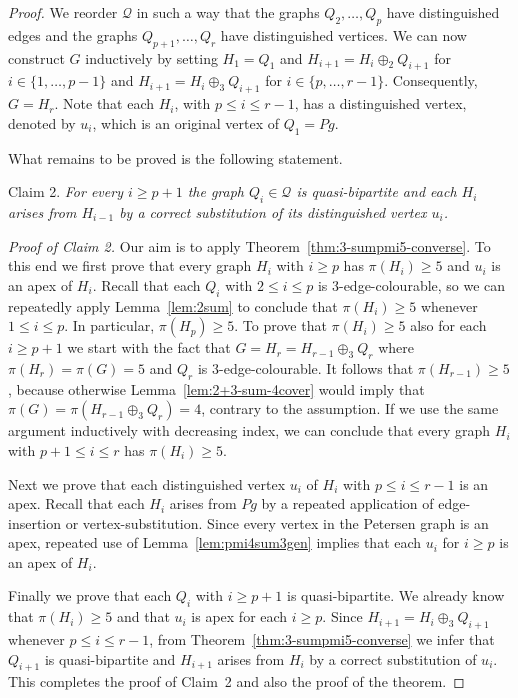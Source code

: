 \documentclass[a4paper]{amsart}
\theoremstyle{plain}
\theoremstyle{definition}
\begin{document}
\begin{proof}
We reorder $\mathcal{Q}$ in such a way that the graphs $Q_2,
\ldots, Q_p$ have distinguished edges and the graphs $Q_{p+1},
\ldots, Q_r$ have distinguished vertices. We can now construct
$G$ inductively by setting $H_1=Q_1$ and $H_{i+1}=H_i\oplus_2
Q_{i+1}$ for $i\in\{1,\ldots, p-1\}$ and $H_{i+1}=H_i\oplus_3
Q_{i+1}$ for $i\in\{p, \ldots, r-1\}$. Consequently, $G=H_r$.
Note that each $H_i$, with $p\le i\le r-1$, has a distinguished
vertex, denoted by $u_i$, which is an original vertex of
$Q_1=Pg$.

What remains to be proved is the following statement.

\medskip\noindent
Claim 2. \emph{For every $i\ge p+1$ the graph
$Q_i\in\mathcal{Q}$ is quasi-bipartite and each $H_i$ arises
from $H_{i-1}$ by a correct substitution of its distinguished
vertex $u_i$.}

\medskip\noindent
\emph{Proof of Claim 2.} Our aim is to apply
Theorem~\ref{thm:3-sumpmi5-converse}. To this end we first
prove that every graph $H_i$ with $i\ge p$ has $\pi(H_i)\ge 5$
and $u_i$ is an apex of $H_i$. Recall that each $Q_i$ with
$2\le i\le p$ is $3$-edge-colourable, so we can repeatedly
apply Lemma~\ref{lem:2sum} to conclude that $\pi(H_i)\ge 5$
whenever $1\le i \le p$. In particular, $\pi(H_p)\ge 5$. To
prove that $\pi(H_i)\ge 5$ also for each $i\ge p+1$ we start
with the fact that $G=H_r=H_{r-1}\oplus_3 Q_r$ where
$\pi(H_r)=\pi(G)=5$ and $Q_r$ is $3$-edge-colourable. It
follows that $\pi(H_{r-1})\ge 5$, because otherwise
Lemma~\ref{lem:2+3-sum-4cover} would imply that
$\pi(G)=\pi(H_{r-1}\oplus_3 Q_r)=4$, contrary to the
assumption. If we use the same argument inductively with
decreasing index, we can conclude that every graph $H_i$ with
$p+1\le i\le r$ has $\pi(H_i)\ge 5$.

Next we prove that each distinguished vertex $u_i$ of $H_i$
with $p\le i\le r-1$ is an apex. Recall that each $H_i$ arises
from $Pg$ by a repeated application of edge-insertion or
vertex-substitution. Since every vertex in the Petersen graph
is an apex, repeated use of Lemma~\ref{lem:pmi4sum3gen} implies
that each $u_i$ for $i\geq p$ is an apex of $H_i$.

Finally we prove that each $Q_i$ with $i\ge p+1$ is
quasi-bipartite. We already know that $\pi(H_i)\ge 5$ and that
$u_i$ is apex for each $i\ge p$. Since $H_{i+1}=H_i\oplus_3
Q_{i+1}$ whenever $p\le i\le r-1$, from
Theorem~\ref{thm:3-sumpmi5-converse} we infer that $Q_{i+1}$ is
quasi-bipartite and $H_{i+1}$ arises from $H_i$ by a correct
substitution of $u_i$. This completes the proof of Claim~2 and
also the proof of the theorem.
\end{proof}
\end{document}
